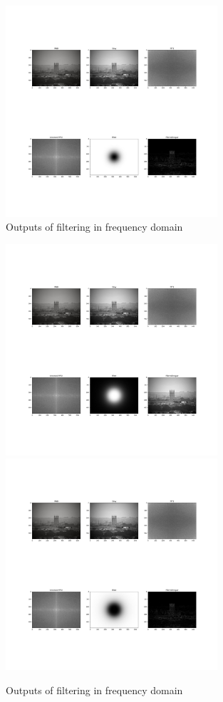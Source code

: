 \documentclass{article}
\begin{document}
{{\begin{figure}[htp]
            \includegraphics[width=0.7\textwidth]{Assignment-11/fig-v34.jpg}
            \caption{Outputs of filtering in frequency domain}
        \end{figure}
        \begin{figure}[htp]
            \centering
            \includegraphics[width=0.7\textwidth]{Assignment-11/fig-v35.jpg}
            \includegraphics[width=0.7\textwidth]{Assignment-11/fig-v36.jpg}
            \caption{Outputs of filtering in frequency domain}
        \end{figure}
    }
}
\clearpage
\end{document}
